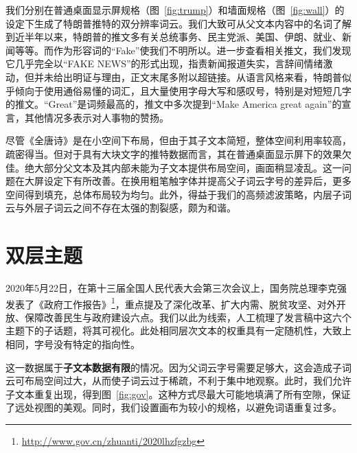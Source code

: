 我们分别在普通桌面显示屏规格（图~\ref{fig:trump}）和墙面规格（图~\ref{fig:wall}）的设定下生成了特朗普推特的双分辨率词云。我们大致可从父文本内容中的名词了解到近半年以来，特朗普的推文多有关总统事务、民主党派、美国、伊朗、就业、新闻等等。而作为形容词的``Fake''使我们不明所以。进一步查看相关推文，我们发现它几乎完全以``FAKE NEWS''的形式出现，指责新闻报道失实，言辞间情绪激动，但并未给出明证与理由，正文末尾多附以超链接。从语言风格来看，特朗普似乎倾向于使用通俗易懂的词汇，且大量使用字母大写和感叹号，特别是对短短几字的推文。``Great''是词频最高的，推文中多次提到``Make America great again''的宣言，其他情况多表示对人事物的赞扬。

尽管《全唐诗》是在小空间下布局，但由于其子文本简短，整体空间利用率较高，疏密得当。但对于具有大块文字的推特数据而言，其在普通桌面显示屏下的效果欠佳。绝大部分父文本及其内部未能为子文本提供布局空间，画面稍显凌乱。这一问题在大屏设定下有所改善。在换用粗笔触字体并提高父子词云字号的差异后，更多空间得到填充，总体布局较为均匀。此外，得益于我们的高频滤波策略，内层子词云与外层子词云之间不存在太强的割裂感，颇为和谐。


\section{双层主题}

2020年5月22日，在第十三届全国人民代表大会第三次会议上，国务院总理李克强发表了《政府工作报告》\footnote{\url{http://www.gov.cn/zhuanti/2020lhzfgzbg}}，重点提及了深化改革、扩大内需、脱贫攻坚、对外开放、保障改善民生与政府建设六点。我们以此为线索，人工梳理了发言稿中这六个主题下的子话题，将其可视化。此处相同层次文本的权重具有一定随机性，大致上相同，字号没有特定的指向性。

这一数据属于\textbf{子文本数据有限}的情况。因为父词云字号需要足够大，这会造成子词云可布局空间过大，从而使子词云过于稀疏，不利于集中地观察。此时，我们允许子文本重复出现，得到图~\ref{fig:gov}。这种方式尽最大可能地填满了所有空隙，保证了远处视图的美观。同时，我们设置画布为较小的规格，以避免词语重复过多。

\bigbreak




